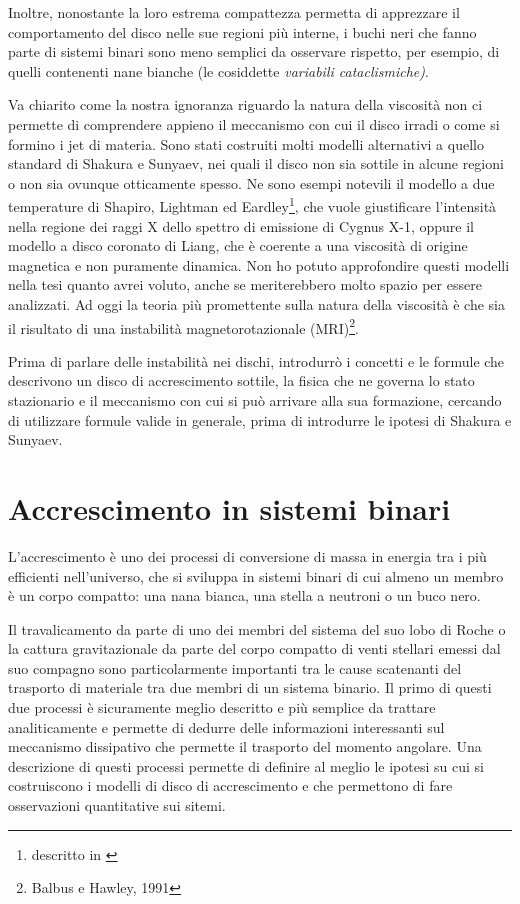 \documentclass[a4paperbi]{article}
\begin{document}
	Inoltre, nonostante la loro estrema compattezza permetta di apprezzare il comportamento del disco nelle sue regioni più interne, i buchi neri che fanno parte di sistemi binari sono meno semplici da osservare rispetto, per esempio, di quelli contenenti nane bianche (le cosiddette \textit{variabili cataclismiche)}.

	Va chiarito come la nostra ignoranza riguardo la natura della viscosità non ci permette di comprendere appieno il meccanismo con cui il disco irradi o come si formino i jet di materia. Sono stati costruiti molti modelli alternativi a quello standard di Shakura e Sunyaev, nei quali il disco non sia sottile in alcune regioni o non sia ovunque otticamente spesso. Ne sono esempi notevili il modello a due temperature di Shapiro, Lightman ed Eardley\footnote{descritto in \cite{ShapiroLightmanEardley1976}}, che vuole giustificare l'intensità nella regione dei raggi X dello spettro di emissione di Cygnus X-1, oppure il modello a disco coronato di Liang, che è coerente a una viscosità di origine magnetica e non puramente dinamica. Non ho potuto approfondire questi modelli nella tesi quanto avrei voluto, anche se meriterebbero molto spazio per essere analizzati. Ad oggi la teoria più promettente sulla natura della viscosità è che sia il risultato di una instabilità magnetorotazionale (MRI)\footnote{Balbus e Hawley, 1991}.

	Prima di parlare delle instabilità nei dischi, introdurrò i concetti e le formule che descrivono un disco di accrescimento sottile, la fisica che ne governa lo stato stazionario e il meccanismo con cui si può arrivare alla sua formazione, cercando di utilizzare formule valide in generale, prima di introdurre le ipotesi di Shakura e Sunyaev.
	
\newpage
\section{Accrescimento in sistemi binari}
	L'accrescimento è uno dei processi di conversione di massa in energia tra i più efficienti nell'universo, che si sviluppa in sistemi binari di cui almeno un membro è un corpo compatto: una nana bianca, una stella a neutroni o un buco nero.

	Il travalicamento da parte di uno dei membri del sistema del suo lobo di Roche o la cattura gravitazionale da parte del corpo compatto di venti stellari emessi dal suo compagno sono particolarmente importanti tra le cause scatenanti del trasporto di materiale tra due membri di un sistema binario. Il primo di questi due processi è sicuramente meglio descritto e più semplice da trattare analiticamente e permette di dedurre delle informazioni interessanti sul meccanismo dissipativo che permette il trasporto del momento angolare. Una descrizione di questi processi permette di definire al meglio le ipotesi su cui si costruiscono i modelli di disco di accrescimento e che permettono di fare osservazioni quantitative sui sitemi.
	
\end{document}
